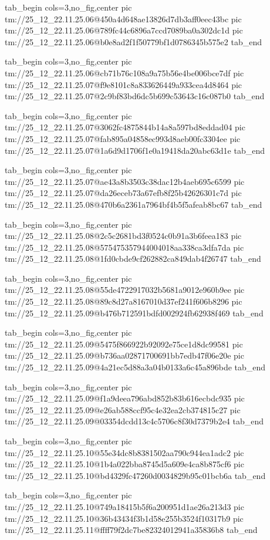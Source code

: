 \ifcmt
  tab_begin cols=3,no_fig,center
    pic tm://25_12_22.11.25.06@450a4d648ae13826d7db3aff0eec43bc
    pic tm://25_12_22.11.25.06@789fc44c6896a7ccd7089ba0a302dc1d
    pic tm://25_12_22.11.25.06@b0e8ad2f1f50779bf1d0786345b575e2
  tab_end
\fi


\ifcmt
  tab_begin cols=3,no_fig,center
    pic tm://25_12_22.11.25.06@cb71b76c108a9a75b56e4be006bce7df
    pic tm://25_12_22.11.25.07@f9e8101c8a833626449a933cea4d8464
    pic tm://25_12_22.11.25.07@2c9bf83bd6dc5b699c53643c16c087b0
  tab_end
\fi


\ifcmt
  tab_begin cols=3,no_fig,center
    pic tm://25_12_22.11.25.07@3062fc4875844b14a8a597bd8eddad04
    pic tm://25_12_22.11.25.07@fab895a04858ec993d8aeb00fc3304ee
    pic tm://25_12_22.11.25.07@1a6d9d1706f1e0a19418da20abc63d1e
  tab_end
\fi


\ifcmt
  tab_begin cols=3,no_fig,center
    pic tm://25_12_22.11.25.07@ae43a8b3503c38dac12b4aeb695c6599
    pic tm://25_12_22.11.25.07@da26eceb73a67efb8f25b42626301c7d
    pic tm://25_12_22.11.25.08@470b6a2361a7964bf4b5f5afeab8bc67
  tab_end
\fi


\ifcmt
  tab_begin cols=3,no_fig,center
    pic tm://25_12_22.11.25.08@2c5c2681bd3f0524c0b91a3b6feea183
    pic tm://25_12_22.11.25.08@575475357944004018aa338ca3dfa7da
    pic tm://25_12_22.11.25.08@1fd0cbde9cf262882ca849dab4f26747
  tab_end
\fi


\ifcmt
  tab_begin cols=3,no_fig,center
    pic tm://25_12_22.11.25.08@55de4722917032b5681a9012e960b9ee
    pic tm://25_12_22.11.25.08@89c8d27a8167010d37ef241f606b8296
    pic tm://25_12_22.11.25.09@b476b712591bdfd002924fb62938f469
  tab_end
\fi


\ifcmt
  tab_begin cols=3,no_fig,center
    pic tm://25_12_22.11.25.09@5475f866922b92092e75ce1d8dc99581
    pic tm://25_12_22.11.25.09@b736aa02871700691bb7edb47f06e20e
    pic tm://25_12_22.11.25.09@4a21ec5d88a3a04b0133a6c45a896bde
  tab_end
\fi


\ifcmt
  tab_begin cols=3,no_fig,center
    pic tm://25_12_22.11.25.09@f1a9deea796abd852b83b616ecbdc935
    pic tm://25_12_22.11.25.09@e26ab588ccf95c4e32ea2cb374815c27
    pic tm://25_12_22.11.25.09@03354dcdd13c4c5706c8f30d7379b2e4
  tab_end
\fi


\ifcmt
  tab_begin cols=3,no_fig,center
    pic tm://25_12_22.11.25.10@55e34dc8b8381502aa790c944ea1adc2
    pic tm://25_12_22.11.25.10@1b4a022bba8745d5a609e4ca8b875cf6
    pic tm://25_12_22.11.25.10@bd4329fc47260d0034829b95c01bcb6a
  tab_end
\fi


\ifcmt
  tab_begin cols=3,no_fig,center
    pic tm://25_12_22.11.25.10@749a18415b5f6a200951d1ae26a213d3
    pic tm://25_12_22.11.25.10@36b43434f3b1d58e255b3524f10317b9
    pic tm://25_12_22.11.25.11@ffff79f2dc7be82324012941a35836b8
  tab_end
\fi


